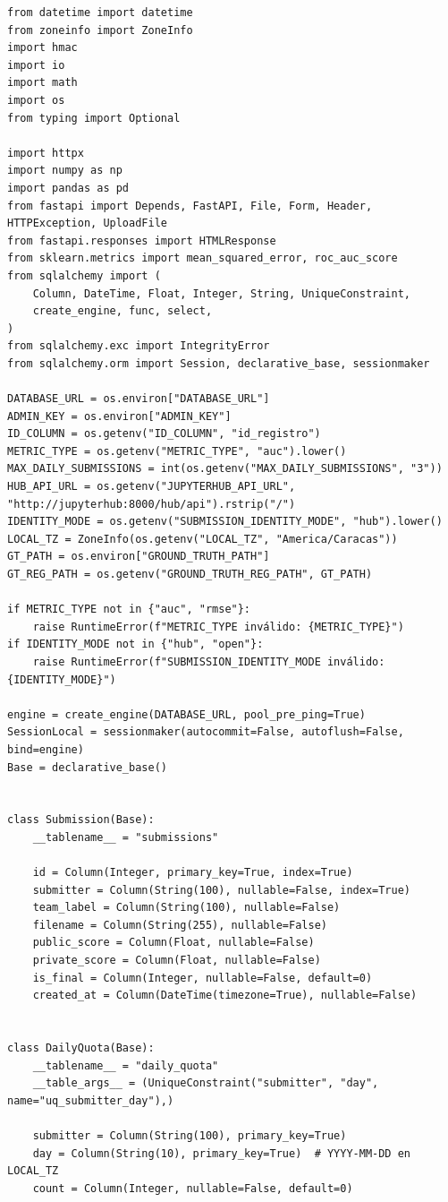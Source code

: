 \documentclass[11pt,a4paper]{article}
\begin{document}
\begin{lstlisting}
from datetime import datetime
from zoneinfo import ZoneInfo
import hmac
import io
import math
import os
from typing import Optional

import httpx
import numpy as np
import pandas as pd
from fastapi import Depends, FastAPI, File, Form, Header, HTTPException, UploadFile
from fastapi.responses import HTMLResponse
from sklearn.metrics import mean_squared_error, roc_auc_score
from sqlalchemy import (
    Column, DateTime, Float, Integer, String, UniqueConstraint,
    create_engine, func, select,
)
from sqlalchemy.exc import IntegrityError
from sqlalchemy.orm import Session, declarative_base, sessionmaker

DATABASE_URL = os.environ["DATABASE_URL"]
ADMIN_KEY = os.environ["ADMIN_KEY"]
ID_COLUMN = os.getenv("ID_COLUMN", "id_registro")
METRIC_TYPE = os.getenv("METRIC_TYPE", "auc").lower()
MAX_DAILY_SUBMISSIONS = int(os.getenv("MAX_DAILY_SUBMISSIONS", "3"))
HUB_API_URL = os.getenv("JUPYTERHUB_API_URL", "http://jupyterhub:8000/hub/api").rstrip("/")
IDENTITY_MODE = os.getenv("SUBMISSION_IDENTITY_MODE", "hub").lower()
LOCAL_TZ = ZoneInfo(os.getenv("LOCAL_TZ", "America/Caracas"))
GT_PATH = os.environ["GROUND_TRUTH_PATH"]
GT_REG_PATH = os.getenv("GROUND_TRUTH_REG_PATH", GT_PATH)

if METRIC_TYPE not in {"auc", "rmse"}:
    raise RuntimeError(f"METRIC_TYPE inválido: {METRIC_TYPE}")
if IDENTITY_MODE not in {"hub", "open"}:
    raise RuntimeError(f"SUBMISSION_IDENTITY_MODE inválido: {IDENTITY_MODE}")

engine = create_engine(DATABASE_URL, pool_pre_ping=True)
SessionLocal = sessionmaker(autocommit=False, autoflush=False, bind=engine)
Base = declarative_base()


class Submission(Base):
    __tablename__ = "submissions"

    id = Column(Integer, primary_key=True, index=True)
    submitter = Column(String(100), nullable=False, index=True)
    team_label = Column(String(100), nullable=False)
    filename = Column(String(255), nullable=False)
    public_score = Column(Float, nullable=False)
    private_score = Column(Float, nullable=False)
    is_final = Column(Integer, nullable=False, default=0)
    created_at = Column(DateTime(timezone=True), nullable=False)


class DailyQuota(Base):
    __tablename__ = "daily_quota"
    __table_args__ = (UniqueConstraint("submitter", "day", name="uq_submitter_day"),)

    submitter = Column(String(100), primary_key=True)
    day = Column(String(10), primary_key=True)  # YYYY-MM-DD en LOCAL_TZ
    count = Column(Integer, nullable=False, default=0)



\end{lstlisting}
\end{document}
